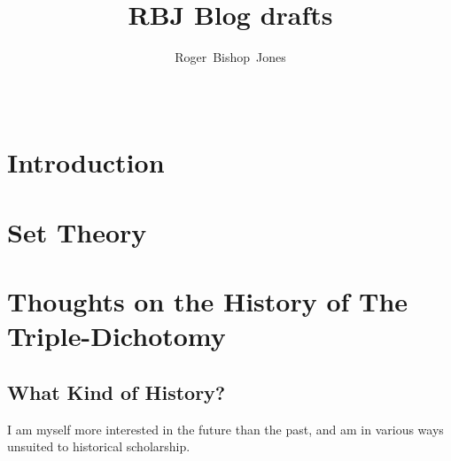 \documentclass[10pt,titlepage]{article}
\title{RBJ Blog drafts}
\author{Roger~Bishop~Jones}
\date{\ }
\begin{document}
                               
\begin{titlepage}
\maketitle






\end{titlepage}

\setcounter{tocdepth}{2}
{\parskip-0pt\tableofcontents}



\section{Introduction}



\section{Set Theory}

\subsection{}

\section{Thoughts on the History of The Triple-Dichotomy}

\subsection{What Kind of History?}

I am myself more interested in the future than the past, and am in various ways unsuited to historical scholarship.
\end{document}
